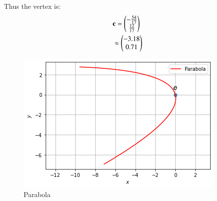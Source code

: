 \documentclass[journal,12pt,twocolumn]{IEEEtran}
\begin{document}
Thus the vertex is:
\begin{align}
	&\mathbf{c}= \begin{pmatrix}-\frac{54}{17}\\ \frac{12}{17}\end{pmatrix} \\
	&\approx \begin{pmatrix}-3.18\\ 0.71\end{pmatrix}
\end{align}

\begin{figure}[!htbp]
	\centering
	\includegraphics[width =\columnwidth]{parabola plot.png}
	\caption{Parabola }
	\label{fig:1}
\end{figure}	
\end{document}

